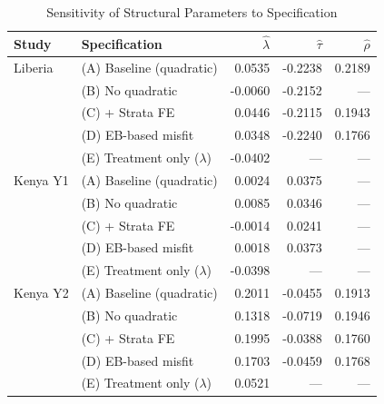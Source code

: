 \begin{table}[htbp]
\centering\small
\caption{Sensitivity of Structural Parameters to Specification}
\label{tab:calib_sensitivity}
\begin{tabular}{llrrr}
\toprule
Study & Specification & $\hat{\lambda}$ & $\hat{\tau}$ & $\hat{\rho}$ \\
\midrule
Liberia & (A) Baseline (quadratic) & 0.0535 & -0.2238 & 0.2189 \\
 & (B) No quadratic & -0.0060 & -0.2152 & --- \\
 & (C) + Strata FE & 0.0446 & -0.2115 & 0.1943 \\
 & (D) EB-based misfit & 0.0348 & -0.2240 & 0.1766 \\
 & (E) Treatment only ($\lambda$) & -0.0402 & --- & --- \\
\addlinespace
Kenya Y1 & (A) Baseline (quadratic) & 0.0024 & 0.0375 & --- \\
 & (B) No quadratic & 0.0085 & 0.0346 & --- \\
 & (C) + Strata FE & -0.0014 & 0.0241 & --- \\
 & (D) EB-based misfit & 0.0018 & 0.0373 & --- \\
 & (E) Treatment only ($\lambda$) & -0.0398 & --- & --- \\
\addlinespace
Kenya Y2 & (A) Baseline (quadratic) & 0.2011 & -0.0455 & 0.1913 \\
 & (B) No quadratic & 0.1318 & -0.0719 & 0.1946 \\
 & (C) + Strata FE & 0.1995 & -0.0388 & 0.1760 \\
 & (D) EB-based misfit & 0.1703 & -0.0459 & 0.1768 \\
 & (E) Treatment only ($\lambda$) & 0.0521 & --- & --- \\
\bottomrule
\end{tabular}
\par\smallskip{}
\end{table}